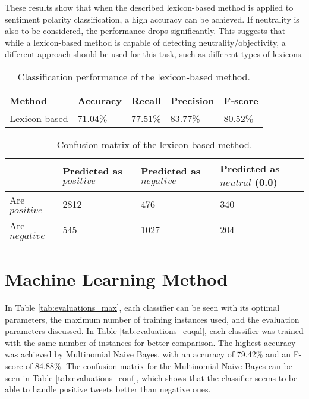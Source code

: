 These results show that when the described lexicon-based method is applied to sentiment polarity classification, a high accuracy can be achieved. If neutrality is also to be considered, the performance drops significantly. This suggests that while a lexicon-based method is capable of detecting neutrality/objectivity, a different approach should be used for this task, such as different types of lexicons.

\begin{table}
\caption{Classification performance of the lexicon-based method.}
\label{tab:eval_lex}
\centering
\begin{tabular}{ |p{3cm}||p{2cm}|p{2cm}|p{2cm}|p{2cm}|}
 \hline
 Method &          Accuracy &      Recall &     Precision& F-score \\
  \hline
 Lexicon-based & 71.04\% & 77.51\% & 83.77\% & 80.52\% \\
 \hline
 \end{tabular}
 
\end{table}
\begin{table}
\centering
\caption{Confusion matrix of the lexicon-based method.}
\begin{tabular}{ |p{3cm}||p{3cm}|p{3cm}|p{3cm}| }
 \hline
  &          Predicted as $positive$ &Predicted as $negative$  & Predicted as $neutral$ (0.0)\\
 \hline
 Are $positive$        & 2812&            476 & 340\\
  \hline
 Are $negative$  &545&                     1027 & 204\\
 \hline

\end{tabular}
\label{tab:evaluations_conf_lex}
\end{table}


\section{Machine Learning Method}

In Table \ref{tab:evaluations_max}, each classifier can be seen with its optimal parameters, the maximum number of training instances used, and the evaluation parameters discussed. In Table \ref{tab:evaluations_euqal}, each classifier was trained with the same number of instances for better comparison. The highest accuracy was achieved by Multinomial Naive Bayes, with an accuracy of 79.42\% and an F-score of 84.88\%. The confusion matrix for the Multinomial Naive Bayes can be seen in Table \ref{tab:evaluations_conf}, which shows that the classifier seems to be able to handle positive tweets better than negative ones.

